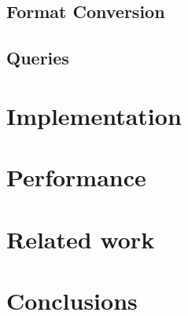 \documentclass{sig-alternate}
\begin{document}
\subsection{Format Conversion}
\subsection{Queries}
\section{Implementation}
\section{Performance}
\section{Related work}
\section{Conclusions}

 
\end{document}

